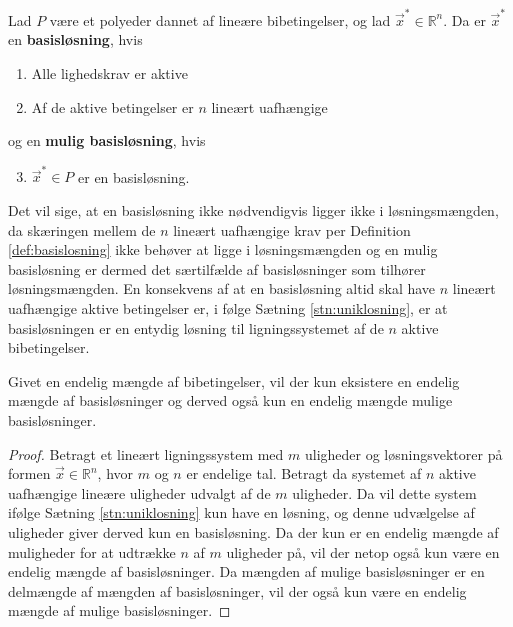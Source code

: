 \begin{defn}
Lad $P$ være et polyeder dannet af lineære bibetingelser, og lad $\vec{x}^*\in \mathds{R}^n$. Da er $\vec{x}^*$ en \textbf{basisløsning}, hvis
\begin{enumerate}[label=(\alph*)]
\item Alle lighedskrav er aktive
\item Af de aktive betingelser er $n$ lineært uafhængige
\end{enumerate}
og en \textbf{mulig basisløsning}, hvis
\begin{enumerate}%
\setcounter{enumi}{2}
\item $\vec{x}^* \in P$ er en basisløsning.
\end{enumerate}
\label{def:basislosning}
\end{defn}
Det vil sige, at en basisløsning ikke nødvendigvis ligger ikke i løsningsmængden, da skæringen mellem de $n$ lineært uafhængige krav  per Definition \ref{def:basislosning} ikke behøver at ligge i løsningsmængden og en mulig basisløsning er dermed det særtilfælde af basisløsninger som tilhører løsningsmængden.
En konsekvens af at en basisløsning altid skal have $n$ lineært uafhængige aktive betingelser er, i følge Sætning \ref{stn:uniklosning}, er at basisløsningen er en entydig løsning til ligningssystemet af de $n$ aktive bibetingelser.

\begin{kor}
Givet en endelig mængde af bibetingelser, vil der kun eksistere en endelig mængde af basisløsninger og derved også kun en endelig mængde mulige basisløsninger.
\label{kor:endeligbasis}
\end{kor}

\begin{proof}
Betragt et lineært ligningssystem med $m$ uligheder og løsningsvektorer på formen $\vec{x} \in \mathds{R}^n$, hvor $m$ og $n$ er endelige tal.
	Betragt da systemet af $n$ aktive uafhængige lineære uligheder udvalgt af de $m$ uligheder. Da vil dette system ifølge Sætning \ref{stn:uniklosning} kun have en løsning, og denne udvælgelse af uligheder giver derved kun en basisløsning. Da der kun er en endelig mængde af muligheder for at udtrække $n$ af $m$ uligheder på, vil der netop også kun være en endelig mængde af basisløsninger. Da mængden af mulige basisløsninger er en delmængde af mængden af basisløsninger, vil der også kun være en endelig mængde af mulige basisløsninger.
\end{proof}

